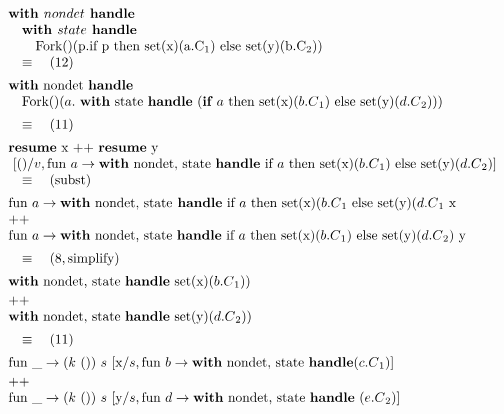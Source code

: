 \documentclass[logo,bsc,singlespacing,parskip]{infthesis}
\begin{document}
\[ 
\begin{array}{l}
\textbf{with } nondet \textbf{ handle} \\
\quad\textbf{with } state \textbf{ handle} \\
\quad\quad \text{Fork()(p.if p then set(x)(a.C\textsubscript{1}) else set(y)(b.C\textsubscript{2}))}
\\
\quad\equiv\quad (12) \\[5pt]
\text{\textbf{with} nondet \textbf{handle}}\ \\ \quad \text{Fork()}(a.\ \text{\textbf{with} state \textbf{handle} } (\textbf{if } a \text{ then set(x)}(b.C\textsubscript{1}) \text{ else set(y)}(d.C\textsubscript{2}))) \\[5pt]
\quad\equiv\quad (11) \\[5pt]
\text{\textbf{resume} x} \text{ ++ } \text{\textbf{resume} y} 
\\ 
\ [()/v, \text{fun } a \rightarrow  \text{\textbf{with} nondet,  state \textbf{handle} if } a \text{ then set(x)}(b.C\textsubscript{1}) \text{ else set(y)}(d.C\textsubscript{2})]
\\ \quad\equiv\quad (\text{subst}) \\[5pt]
\text{fun } a \rightarrow \text{\textbf{with} nondet, state} \textbf{ handle} \text{ if } a \text{ then set(x)}(b.C\textsubscript{1} \text{ else set(y)}(d.C\textsubscript{1}\ \text{x} \\
\text{++} \\
\text{fun } a \rightarrow \text{\textbf{with} nondet, state \textbf{handle} if } a \text{ then set(x)}(b.C\textsubscript{1}) \text{ else set(y)}(d.C\textsubscript{2})\ \text{y} \\[5pt]
\quad\equiv\quad (8, \text{simplify}) \\[5pt]
\text{\textbf{with} nondet, state \textbf{handle} set(x)}(b.C\textsubscript{1})) \\[2pt]
\text{++} \\  \text{\textbf{with} nondet, state \textbf{handle} set(y)}(d.C\textsubscript{2})) \\[5pt]
\quad\equiv\quad (11) \\[5pt]
\text{fun } \_ \rightarrow (k\ ())\ s\ [\text{x}/s, \text{fun } b \rightarrow \text{\textbf{with} nondet, state \textbf{handle}}(c.C\textsubscript{1})] \\[2pt]
 \text{++} \\ \text{fun } \_ \rightarrow (k\ ())\ s\ [\text{y}/s, \text{fun } d \rightarrow \text{\textbf{with} nondet, state \textbf{handle} }(e.C\textsubscript{2})] \\[5pt]

\end{array} 
\] 
\end{document}
